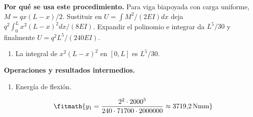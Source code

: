 \noindent\textbf{Por qué se usa este procedimiento.} Para viga biapoyada con carga uniforme, $M=qx(L-x)/2$. Sustituir en $U=\int M^2/(2EI)dx$ deja $q^2\int_0^Lx^2(L-x)^2dx/(8EI)$. Expandir el polinomio e integrar da $L^5/30$ y finalmente $U=q^2L^5/(240EI)$.

\begin{enumerate}

\item La integral de $x^2 (L - x)^2$ en $[0, L]$ es $L^5/30$.

\end{enumerate}

\noindent\textbf{Operaciones y resultados intermedios.}

\begin{enumerate}

\item Energía de flexión.

\[\fitmath{y_{1}=\frac{{2}^{2}\cdot {2000}^{5}}{240\cdot 71700\cdot 2000000}\approx 3719{,}2\,\mathrm{N mm}}\]

\end{enumerate}
